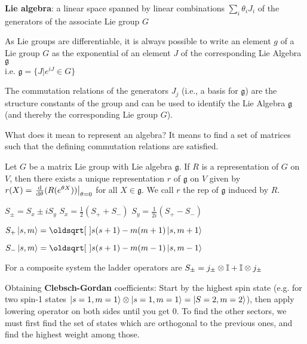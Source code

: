 \begin{squishlist}
\item \textbf{Lie algebra}: a linear space spanned by linear combinations $\sum_i \theta_i J_i$ of the generators of the associate Lie group $G$
\item As Lie groups are differentiable, it is always possible to write an element $g$ of a Lie group $G$ as the exponential of an element $J$ of the corresponding Lie Algebra $\mathfrak{g}$ \\ i.e. $\mathfrak{g} = \{J | e^{iJ} \in G \}$
\item The commutation relations of the generators $J_j$ (i.e., a basis for $\mathfrak{g}$) are the structure constants of the group and can be used to identify the Lie Algebra $\mathfrak{g}$ (and thereby the corresponding Lie group $G$).
\item What does it mean to represent an algebra? It means to find a set of matrices such that the defining commutation relations are satisfied.
\item Let $G$ be a matrix Lie group with Lie algebra $\mathfrak{g}$. If $R$ is a representation of $G$ on $V$, then there exists a unique representation $r$ of $\mathfrak{g}$ on $V$ given by \\
$r(X) = \left.\frac{\textrm{d} }{\textrm{d} \theta}(R(e^{\theta X}))\right|_{\theta=0}$ for all $X \in \mathfrak{g}$. We call $r$ the rep of $\mathfrak{g}$ induced by $R$.
\end{squishlist}

\begin{squishlist}
    \item $S_{\pm} = S_x \pm i S_y$ \squishsep $S_x = \frac{1}{2} (S_+ + S_-)$ \squishsep $S_y = \frac{1}{2i} (S_+ - S_-)$
    \item $S_+ \ket{s,m} = \sqrt{s(s+1) - m(m+1)} \ket{s, m + 1}$
    \item $S_- \ket{s,m} = \sqrt{s(s+1) - m(m-1)} \ket{s, m-1}$
    \item For a composite system the ladder operators are $S_{\pm} = j_{\pm} \otimes \mathbb{I} + \mathbb{I} \otimes j_{\pm}$
    \item Obtaining \textbf{Clebsch-Gordan} coefficients: Start by the highest spin state (e.g. for two spin-1 states $\ket{s=1,m=1} \otimes \ket{s=1,m=1} = \ket{S=2,m=2}$), then apply lowering operator on both sides until you get 0. To find the other sectors, we must first find the set of states which are orthogonal to the previous ones, and find the highest weight among those.
\end{squishlist}

